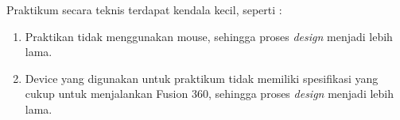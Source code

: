 Praktikum secara teknis terdapat kendala kecil, seperti :

\begin{enumerate}
    \item Praktikan tidak menggunakan mouse, sehingga proses \textit{design} menjadi lebih lama.
    \item Device yang digunakan untuk praktikum tidak memiliki spesifikasi yang cukup untuk menjalankan Fusion 360, sehingga proses \textit{design} menjadi lebih lama.
\end{enumerate}

